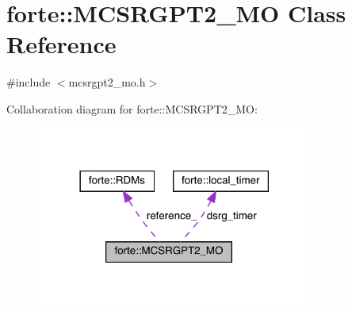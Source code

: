 \hypertarget{classforte_1_1_m_c_s_r_g_p_t2___m_o}{}\section{forte\+:\+:M\+C\+S\+R\+G\+P\+T2\+\_\+\+MO Class Reference}
\label{classforte_1_1_m_c_s_r_g_p_t2___m_o}


{\ttfamily \#include $<$mcsrgpt2\+\_\+mo.\+h$>$}



Collaboration diagram for forte\+:\+:M\+C\+S\+R\+G\+P\+T2\+\_\+\+MO\+:
\nopagebreak
\begin{figure}[H]
\begin{center}
\leavevmode
\includegraphics[width=258pt]{classforte_1_1_m_c_s_r_g_p_t2___m_o__coll__graph}
\end{center}
\end{figure}

